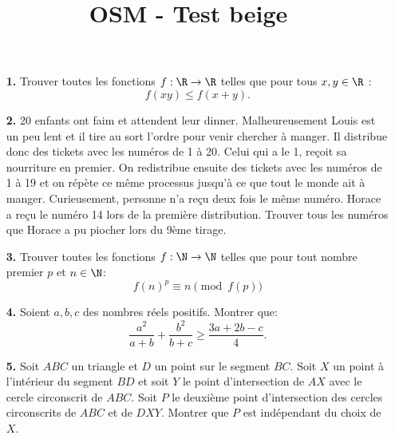 \documentclass[language=french,style=exam]{smo}
\title{OSM - Test beige}
\begin{document}
\begin{enumerate}

\item[\textbf{1.}] Trouver toutes les fonctions $f: \R \rightarrow \R$ telles que pour tous $x,y \in \R$ :
\[
f(xy) \leq f(x+y).
\]

\bigskip

\item[\textbf{2.}] 20 enfants ont faim et attendent leur dinner. Malheureusement Louis est un peu lent et il tire au sort l'ordre pour venir chercher à manger. Il distribue donc des tickets avec les numéros de 1 à 20. Celui qui a le 1, reçoit sa nourriture en premier. On redistribue ensuite des tickets avec les numéros de 1 à 19 et on répète ce même processus jusqu'à ce que tout le monde ait à manger. Curieusement, personne n'a reçu deux fois le même numéro. Horace a reçu le numéro 14 lors de la première distribution. Trouver tous les numéros que Horace a pu piocher lors du 9ème tirage.

\bigskip

\item[\textbf{3.}] Trouver toutes les fonctions $f: \N \rightarrow \N$ telles que pour tout nombre premier $p$ et $n\in \N$: 
\[
f(n)^p \equiv n \pmod{f(p)}
\]

\bigskip

\item[\textbf{4.}] Soient $a,b,c$ des nombres réels positifs. Montrer que: 
\[
\frac{a^2}{a+b} + \frac{b^2}{b+c} \geq \frac{3a+2b-c}{4}.
\]

\bigskip

\item[\textbf{5.}] Soit $ABC$ un triangle et $D$ un point sur le segment $BC$. Soit $X$ un point à l'intérieur du segment $BD$ et soit $Y$ le point d'intersection de $AX$ avec le cercle circonscrit de $ABC$. Soit $P$ le deuxième point d'intersection des cercles circonscrits de $ABC$ et de $DXY$. Montrer que $P$ est indépendant du choix de $X$.\\

\bigskip

\end{enumerate}

\vspace{1cm}

\end{document}
